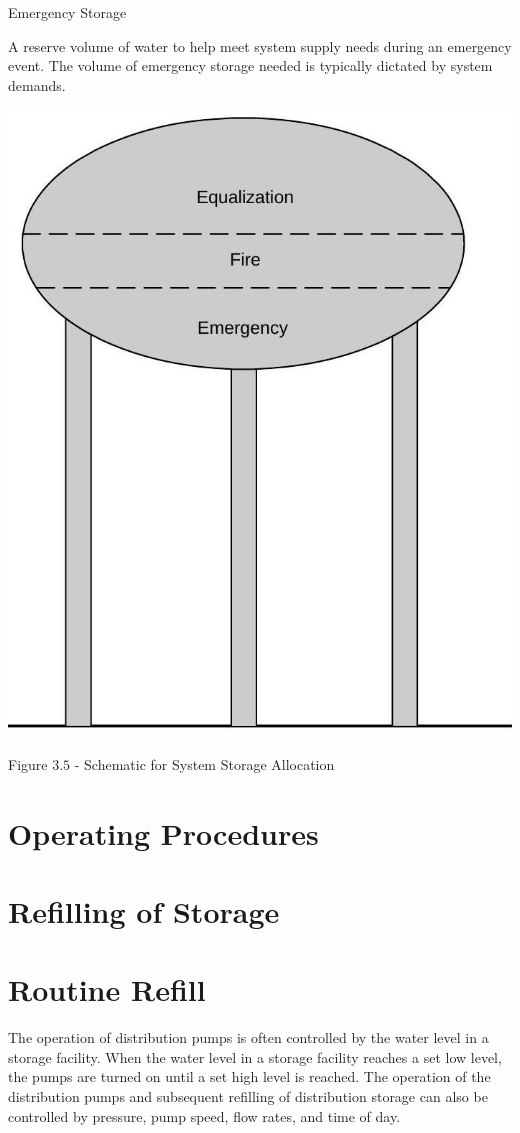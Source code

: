 \documentclass[10pt]{article}
\begin{document}
Emergency Storage

A reserve volume of water to help meet system supply needs during an emergency event. The volume of emergency storage needed is typically dictated by system demands.

\includegraphics[max width=\textwidth]{2022_10_30_098bb5f44c5986ff92a9g-54}

Figure $3.5$ - Schematic for System Storage Allocation

\section{Operating Procedures}
\section{Refilling of Storage}
\section{Routine Refill}
The operation of distribution pumps is often controlled by the water level in a storage facility. When the water level in a storage facility reaches a set low level, the pumps are turned on until a set high level is reached. The operation of the distribution pumps and subsequent refilling of distribution storage can also be controlled by pressure, pump speed, flow rates, and time of day.
\end{document}
